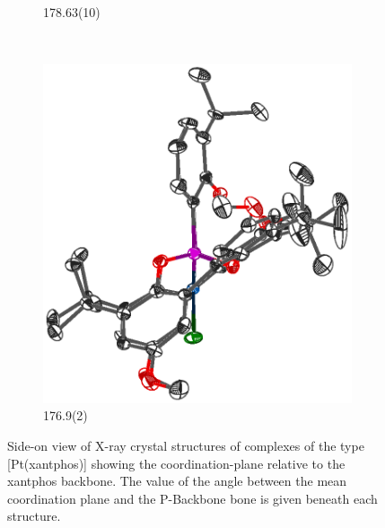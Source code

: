 \begin{figure}[htbp]
\begin{subfigure}[b]{0.4\textwidth}
                \caption{178.63(10)\degrees}
                \label{PtCl2BINAPside}
        \end{subfigure}
        ~
        \begin{subfigure}[b]{0.4\textwidth}
                \includegraphics[width=\textwidth]{../Othercrystals/PtCl2/220613side.eps}
                \caption{176.9(2)\degrees}
                \label{PtCl2side}
        \end{subfigure}
        \caption[Side-on view of X-ray crystal structures of complexes of the type [Pt(xantphos){]}]{Side-on view of X-ray crystal structures of complexes of the type [Pt(xantphos)] showing the coordination-plane relative to the xantphos backbone. The value of the angle between the mean coordination plane and the P-Backbone bone is given beneath each structure.}
        \label{crystal:otherPtCl2side}
\end{figure}

